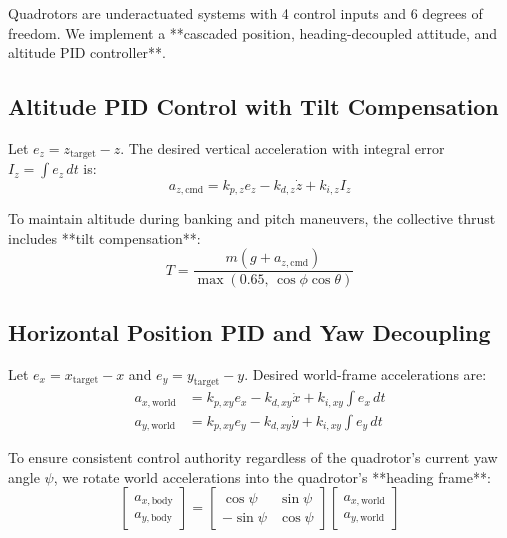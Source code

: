 \documentclass[11pt,a4paper]{article}
\begin{document}
Quadrotors are underactuated systems with 4 control inputs and 6 degrees of freedom. We implement a **cascaded position, heading-decoupled attitude, and altitude PID controller**.

\subsection{Altitude PID Control with Tilt Compensation}
Let $e_z = z_{\text{target}} - z$. The desired vertical acceleration with integral error $I_z = \int e_z \, dt$ is:
\begin{equation}
a_{z,\text{cmd}} = k_{p,z} e_z - k_{d,z} \dot{z} + k_{i,z} I_z
\end{equation}

To maintain altitude during banking and pitch maneuvers, the collective thrust includes **tilt compensation**:
\begin{equation}
T = \frac{m(g + a_{z,\text{cmd}})}{\max(0.65, \, \cos\phi \cos\theta)}
\end{equation}

\subsection{Horizontal Position PID and Yaw Decoupling}
Let $e_x = x_{\text{target}} - x$ and $e_y = y_{\text{target}} - y$. Desired world-frame accelerations are:
\begin{align}
a_{x,\text{world}} &= k_{p,xy} e_x - k_{d,xy} \dot{x} + k_{i,xy} \int e_x \, dt \\
a_{y,\text{world}} &= k_{p,xy} e_y - k_{d,xy} \dot{y} + k_{i,xy} \int e_y \, dt
\end{align}

To ensure consistent control authority regardless of the quadrotor's current yaw angle $\psi$, we rotate world accelerations into the quadrotor's **heading frame**:
\begin{equation}
\begin{bmatrix} a_{x,\text{body}} \\ a_{y,\text{body}} \end{bmatrix} =
\begin{bmatrix} \cos\psi & \sin\psi \\ -\sin\psi & \cos\psi \end{bmatrix}
\begin{bmatrix} a_{x,\text{world}} \\ a_{y,\text{world}} \end{bmatrix}
\end{equation}
\end{document}

